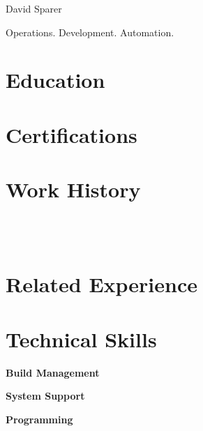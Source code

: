 \documentclass{cls/res}
\begin{document}
	\thispagestyle{empty} %

	\begin{resume}
		\vspace{-0.5in}
		\begin{minipage}[c]{0.78\textwidth}
			\centerline{{\Huge David Sparer}}
			\vspace{.2in}
			\centerline{Operations. Development. Automation.}
		\end{minipage}
		\begin{minipage}[c]{0.25\textwidth}
			
		\end{minipage}

		\section{Education}
			\vspace{0.1in}
			

		\section{Certifications}
			\vspace{0.1in}
			

		\section{Work History}
			
			
			
			
			
			\\\\
			

		\section{Related Experience}
			\vspace{0.1in}
			

		\section{Technical Skills}
			\vspace{0.1in}
			{\bf Build Management}
				\vspace{-0.1in}
				
			\vspace{-0.1in}
			{\bf System Support}
				\vspace{-0.1in}
				
			\vspace{-0.1in}
			{\bf Programming}
				\vspace{-0.1in}
				

	\end{resume}
\end{document}
